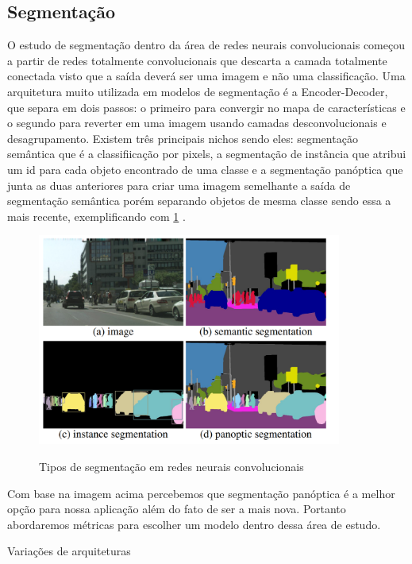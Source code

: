 \subsection{Segmentação}

O estudo de segmentação dentro da área de redes neurais convolucionais começou a partir de redes totalmente convolucionais que descarta a camada totalmente conectada visto que a saída deverá ser uma imagem e não uma classificação. Uma arquitetura muito utilizada em modelos de segmentação é a Encoder-Decoder, que separa em dois passos: o primeiro para convergir no mapa de características e o segundo para reverter em uma imagem usando camadas desconvolucionais e desagrupamento. Existem três principais nichos sendo eles: segmentação semântica que é a classifiicação por pixels, a segmentação de instância que atribui um id para cada objeto encontrado de uma classe e a segmentação panóptica que junta as duas anteriores para criar uma imagem semelhante a saída de segmentação semântica porém separando objetos de mesma classe sendo essa a mais recente, exemplificando com \cref{fig:segentacoes} \cite{dp_semantic_segmantation, lapix}. 

\begin{figure}[H]
	\caption{Tipos de segmentação em redes neurais convolucionais}
	\centering %
	\includegraphics[width=10cm]{figures/segmantations.png} %
	\label{fig:segentacoes}
\end{figure}

Com base na imagem acima percebemos que segmentação panóptica é a melhor opção para nossa aplicação além do fato de ser a mais nova. Portanto abordaremos métricas para escolher um modelo dentro dessa área de estudo.



Variações de arquiteturas